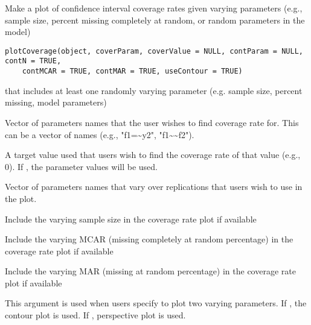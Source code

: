 \documentclass[a4paper]{book}
\begin{document}
%
\begin{Description}\relax
Make a plot of confidence interval coverage rates given varying parameters (e.g., sample size, percent missing completely at random, or random parameters in the model)
\end{Description}
%
\begin{Usage}
\begin{verbatim}
plotCoverage(object, coverParam, coverValue = NULL, contParam = NULL, contN = TRUE, 
    contMCAR = TRUE, contMAR = TRUE, useContour = TRUE)
\end{verbatim}
\end{Usage}
%
\begin{Arguments}
\begin{ldescription}
\item[\code{object}] 
 that includes at least one randomly varying parameter (e.g. sample size, percent missing, model parameters)

\item[\code{coverParam}] 
Vector of parameters names that the user wishes to find coverage rate for. This can be a vector of names (e.g., "f1=\textasciitilde{}y2", "f1\textasciitilde{}\textasciitilde{}f2").

\item[\code{coverValue}] 
A target value used that users wish to find the coverage rate of that value (e.g., 0). If , the parameter values will be used.

\item[\code{contParam}] 
Vector of parameters names that vary over replications that users wish to use in the plot.

\item[\code{contN}] 
Include the varying sample size in the coverage rate plot if available

\item[\code{contMCAR}] 
Include the varying MCAR (missing completely at random percentage) in the coverage rate plot if available

\item[\code{contMAR}] 
Include the varying MAR (missing at random percentage) in the coverage rate plot if available

\item[\code{useContour}] 
This argument is used when users specify to plot two varying parameters. If , the contour plot is used. If , perspective plot is used.

\end{ldescription}
\end{Arguments}
\end{document}
